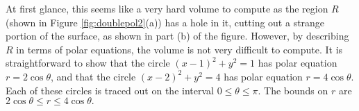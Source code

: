 {At first glance, this seems like a very hard volume to compute as the region $R$ (shown in Figure \ref{fig:doublepol2}(a)) has a hole in it, cutting out a strange portion of the surface, as shown in part (b) of the figure. However, by describing $R$ in terms of polar equations, the volume is not very difficult to compute.
It is straightforward to show that the circle $(x-1)^2+y^2=1$ has polar equation $r=2\cos\theta$, and that the circle $(x-2)^2+y^2=4$ has polar equation $r=4\cos\theta$. Each of these circles is traced out on the interval $0\leq\theta\leq\pi$. The bounds on $r$ are $2\cos\theta\leq r\leq 4\cos\theta.$ 

}
